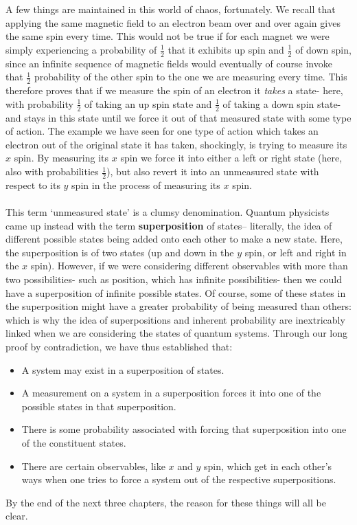 \\\\
A few things are maintained in this world of chaos, fortunately. We recall that applying the same magnetic field to an electron beam over and over again gives the same spin every time. This would not be true if for each magnet we were simply experiencing a probability of $\frac{1}{2}$ that it exhibits up spin and $\frac{1}{2}$ of down spin, since an infinite sequence of magnetic fields would eventually of course invoke that $\frac{1}{2}$ probability of the other spin to the one we are measuring every time. This therefore proves that if we measure the spin of an electron it \textit{takes} a state- here, with probability $\frac{1}{2}$ of taking an up spin state and $\frac{1}{2}$ of taking a down spin state- and stays in this state until we force it out of that measured state with some type of action. The example we have seen for one type of action which takes an electron out of the original state it has taken, shockingly, is trying to measure its $x$ spin. By measuring its $x$ spin we force it into either a left or right state (here, also with probabilities $\frac{1}{2}$), but also revert it into an unmeasured state with respect to its $y$ spin in the process of measuring its $x$ spin.
\\\\
This term `unmeasured state' is a clumsy denomination. Quantum physicists came up instead with the term \textbf{superposition} of states-- literally, the idea of different possible states being added onto each other to make a new state. Here, the superposition is of two states (up and down in the $y$ spin, or left and right in the $x$ spin). However, if we were considering different observables with more than two possibilities- such as position, which has infinite possibilities- then we could have a superposition of infinite possible states. Of course, some of these states in the superposition might have a greater probability of being measured than others: which is why the idea of superpositions and inherent probability are inextricably linked when we are considering the states of quantum systems. Through our long proof by contradiction, we have thus established that:
\begin{itemize}
    \item A system may exist in a superposition of states.
    \item A measurement on a system in a superposition forces it into one of the possible states in that superposition.
    \item There is some probability associated with forcing that superposition into one of the constituent states.
    \item There are certain observables, like $x$ and $y$ spin, which get in each other's ways when one tries to force a system out of the respective superpositions.
\end{itemize}
By the end of the next three chapters, the reason for these things will all be clear. 
